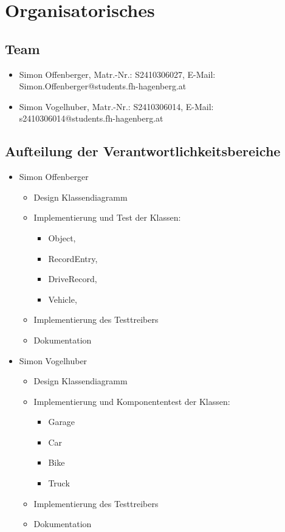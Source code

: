 \documentclass[12pt,naustrian,a4widepaper]{scrartcl}
\begin{document}
\section{Organisatorisches}

\subsection{Team}
\begin{itemize}
	\item Simon Offenberger, Matr.-Nr.: S2410306027, E-Mail: Simon.Offenberger@students.fh-hagenberg.at
	\item Simon Vogelhuber, Matr.-Nr.: S2410306014, E-Mail: s2410306014@students.fh-hagenberg.at	
\end{itemize}

\subsection{Aufteilung der Verantwortlichkeitsbereiche}
\begin{itemize}
	\item Simon Offenberger
		\begin{itemize}
			\item Design Klassendiagramm
			\item Implementierung und Test der Klassen: 
			\begin{itemize}
				\item Object,
				\item RecordEntry, 
				\item DriveRecord,
				\item Vehicle,
			\end{itemize}
			\item Implementierung des Testtreibers
			\item Dokumentation
		\end{itemize}
	\item Simon Vogelhuber
		\begin{itemize}
			\item Design Klassendiagramm
			\item Implementierung und Komponententest der Klassen: 
			\begin{itemize}
				\item Garage
				\item Car
				\item Bike  
				\item Truck 
			\end{itemize}
			\item Implementierung des Testtreibers
			\item Dokumentation
		\end{itemize}	
\end{itemize}
\end{document}

